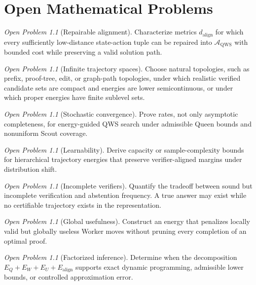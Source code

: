 \documentclass[11pt,oneside]{book}
\theoremstyle{remark}
\newtheorem{openproblem}[definition]{Open Problem}
\newcommand{\AQWS}{\mathcal A_{\mathrm{QWS}}}
\begin{document}
\chapter{Open Mathematical Problems}

\begin{openproblem}[Repairable alignment]
Characterize metrics $d_{\mathrm{align}}$ for which every sufficiently low-distance state-action tuple can be repaired into $\AQWS$ with bounded cost while preserving a valid solution path.
\end{openproblem}

\begin{openproblem}[Infinite trajectory spaces]
Choose natural topologies, such as prefix, proof-tree, edit, or graph-path
topologies, under which realistic verified candidate sets are compact and
energies are lower semicontinuous, or under which proper energies have finite
sublevel sets.
\end{openproblem}

\begin{openproblem}[Stochastic convergence]
Prove rates, not only asymptotic completeness, for energy-guided QWS search under admissible Queen bounds and nonuniform Scout coverage.
\end{openproblem}

\begin{openproblem}[Learnability]
Derive capacity or sample-complexity bounds for hierarchical trajectory energies that preserve verifier-aligned margins under distribution shift.
\end{openproblem}

\begin{openproblem}[Incomplete verifiers]
Quantify the tradeoff between sound but incomplete verification and abstention frequency. A true answer may exist while no certifiable trajectory exists in the representation.
\end{openproblem}

\begin{openproblem}[Global usefulness]
Construct an energy that penalizes locally valid but globally useless Worker moves without pruning every completion of an optimal proof.
\end{openproblem}

\begin{openproblem}[Factorized inference]
Determine when the decomposition $E_Q+E_W+E_U+E_{\mathrm{align}}$ supports exact dynamic programming, admissible lower bounds, or controlled approximation error.
\end{openproblem}
\end{document}
